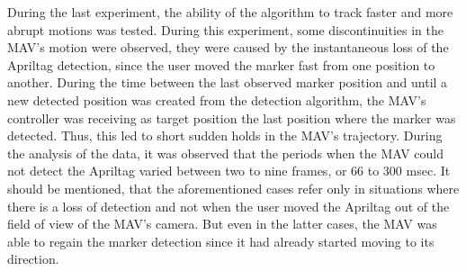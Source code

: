 During the last experiment, the ability of the algorithm to track faster and more abrupt motions was tested. During this experiment, some discontinuities in the MAV's motion were observed, they were caused by the instantaneous loss of the Apriltag detection, since the user moved the marker fast from one position to another. During the time between the last observed marker position and until a new detected position was created from the detection algorithm, the MAV's controller was receiving as target position the last position where the marker was detected. Thus, this led to short sudden holds in the MAV's trajectory. During the analysis of the data, it was observed that the periods when the MAV could not detect the Apriltag varied between two to nine frames, or 66 to 300 msec. It should be mentioned, that the aforementioned cases refer only in situations where there is a loss of detection and not when the user moved the Apriltag out of the field of view of the MAV's camera. But even in the latter cases, the MAV was able to regain the marker detection since it had already started moving to its direction.   

